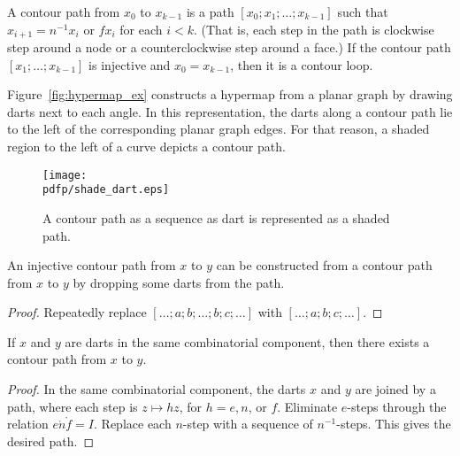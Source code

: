 \begin{definition}  A contour path from $x_0$ to $x_{k-1}$ is a path  $[x_0;x_1;\ldots;x_{k-1}]$ such that $x_{i+1} = n^{-1} x_i$ or $f x_i$ for each $i<k$.  (That is, each step in the path is clockwise step around a node or a counterclockwise step around a face.)   If the contour path $[x_1;\ldots;x_{k-1}]$ is injective and  $x_0 = x_{k-1}$, then it is a contour loop.
\end{definition}

\begin{remark}  Figure~\ref{fig:hypermap_ex} constructs a hypermap from a planar graph by drawing darts next to each angle.  In this representation, the darts along a contour path lie to the left of the corresponding planar graph edges.  For that reason, a shaded region to the left of a curve depicts a contour path.
\end{remark}

\begin{figure}[htb]
  \centering
  \texttt{[image: \\pdfp/shade\_dart.eps]}
  \caption{A contour path as a sequence as dart is represented as a shaded path.}
  \label{fig:shade-dart}
\end{figure}

\begin{lemma} An injective contour path from $x$ to $y$ can be constructed from a contour path from $x$ to $y$ by dropping some darts from the path.
\end{lemma}

\begin{proof} Repeatedly replace $[\ldots;a;b;\ldots;b;c;\ldots]$ with
$[\ldots;a;b;c;\ldots]$.
\end{proof}





\begin{lemma}  
If $x$ and $y$ are darts in the same combinatorial component, then there exists a contour path from $x$ to $y$.
\end{lemma}

\begin{proof} 
In the same combinatorial component, the darts $x$ and $y$ are joined by a path, where each step is $z\mapsto h z$, for $h=e,n$, or $f$.  Eliminate $e$-steps through the relation $e\ocirc n\ocirc f = I$.   Replace each $n$-step with a sequence of $n^{-1}$-steps.  This gives the desired path.
\end{proof}


